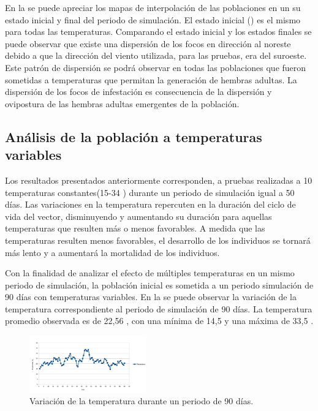 En la  se puede apreciar los mapas de interpolación de las
poblaciones en un su estado inicial y final del periodo de simulación. El estado inicial
() es el mismo para todas las temperaturas. Comparando el estado
inicial y los estados finales se puede observar que existe una dispersión de los focos en
dirección al noreste debido a que la dirección del viento utilizada, para las pruebas, era del
suroeste. Este patrón de dispersión se podrá observar en todas las poblaciones que fueron
sometidas a temperaturas que permitan la generación de hembras adultas. La dispersión de los focos
de infestación es consecuencia de la dispersión y ovipostura de las hembras adultas emergentes de
la población.

\subsection{Análisis de la población a temperaturas variables}
Los resultados presentados anteriormente corresponden, a pruebas realizadas a 10 temperaturas
constantes(15-34 \textcelsius) durante un periodo de simulación igual a 50 días. Las variaciones
en la temperatura repercuten en la duración del ciclo de vida del vector, disminuyendo y
aumentando su duración para aquellas temperaturas que resulten más o menos favorables. A medida
que las temperaturas resulten menos favorables, el desarrollo de los individuos se tornará más
lento y a aumentará la mortalidad de los individuos.

Con la finalidad de analizar el efecto de múltiples temperaturas en un mismo periodo de
simulación, la población inicial es sometida a un periodo simulación de 90 días con temperaturas
variables. En la  se puede observar la variación de la temperatura
correspondiente al periodo de simulación de 90 días. La temperatura promedio observada es de 22,56
\textcelsius, con una mínima de 14,5 \textcelsius y una máxima de 33,5 \textcelsius.

\begin{figure}[!htpb]
    \centering
    \includegraphics[width=0.45\textwidth]{../book/capitulo-6/graphics/temperatura-variable-90.png}
    \caption{\label{fig:var-temperatura}Variación de la temperatura durante un periodo de 90 días.}
\end{figure}

